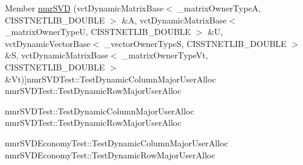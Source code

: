 \begin{DoxyRefList}
Member \hyperlink{nmr_s_v_d_8h_a671bda5b8998b6c851b3a497f2903560}{nmr\-S\-V\-D} (vct\-Dynamic\-Matrix\-Base$<$ \-\_\-matrix\-Owner\-Type\-A, C\-I\-S\-S\-T\-N\-E\-T\-L\-I\-B\-\_\-\-D\-O\-U\-B\-L\-E $>$ \&A, vct\-Dynamic\-Matrix\-Base$<$ \-\_\-matrix\-Owner\-Type\-U, C\-I\-S\-S\-T\-N\-E\-T\-L\-I\-B\-\_\-\-D\-O\-U\-B\-L\-E $>$ \&U, vct\-Dynamic\-Vector\-Base$<$ \-\_\-vector\-Owner\-Type\-S, C\-I\-S\-S\-T\-N\-E\-T\-L\-I\-B\-\_\-\-D\-O\-U\-B\-L\-E $>$ \&S, vct\-Dynamic\-Matrix\-Base$<$ \-\_\-matrix\-Owner\-Type\-Vt, C\-I\-S\-S\-T\-N\-E\-T\-L\-I\-B\-\_\-\-D\-O\-U\-B\-L\-E $>$ \&Vt)]nmr\-S\-V\-D\-Test\-::\-Test\-Dynamic\-Column\-Major\-User\-Alloc nmr\-S\-V\-D\-Test\-::\-Test\-Dynamic\-Row\-Major\-User\-Alloc 
\item[\label{test__test000019}%
\hypertarget{test__test000019}{}%
Member \hyperlink{nmr_s_v_d_8h_a43e3f84f416adc9ceb70daf99fd14b2b}{nmr\-S\-V\-D} (vct\-Dynamic\-Matrix\-Base$<$ \-\_\-matrix\-Owner\-Type\-A, C\-I\-S\-S\-T\-N\-E\-T\-L\-I\-B\-\_\-\-D\-O\-U\-B\-L\-E $>$ \&A, vct\-Dynamic\-Matrix\-Base$<$ \-\_\-matrix\-Owner\-Type\-U, C\-I\-S\-S\-T\-N\-E\-T\-L\-I\-B\-\_\-\-D\-O\-U\-B\-L\-E $>$ \&U, vct\-Dynamic\-Vector\-Base$<$ \-\_\-vector\-Owner\-Type\-S, C\-I\-S\-S\-T\-N\-E\-T\-L\-I\-B\-\_\-\-D\-O\-U\-B\-L\-E $>$ \&S, vct\-Dynamic\-Matrix\-Base$<$ \-\_\-matrix\-Owner\-Type\-Vt, C\-I\-S\-S\-T\-N\-E\-T\-L\-I\-B\-\_\-\-D\-O\-U\-B\-L\-E $>$ \&Vt, vct\-Dynamic\-Vector\-Base$<$ \-\_\-vector\-Owner\-Type\-Workspace, C\-I\-S\-S\-T\-N\-E\-T\-L\-I\-B\-\_\-\-D\-O\-U\-B\-L\-E $>$ \&Workspace)]nmr\-S\-V\-D\-Test\-::\-Test\-Dynamic\-Column\-Major\-User\-Alloc nmr\-S\-V\-D\-Test\-::\-Test\-Dynamic\-Row\-Major\-User\-Alloc  
\item[\label{test__test000025}%
\hypertarget{test__test000025}{}%
Member \hyperlink{nmr_s_v_d_economy_8h_a838d5cc272226fda8e2aed9830f405e3}{nmr\-S\-V\-D\-Economy} (vct\-Dynamic\-Matrix\-Base$<$ \-\_\-matrix\-Owner\-Type\-A, C\-I\-S\-S\-T\-N\-E\-T\-L\-I\-B\-\_\-\-D\-O\-U\-B\-L\-E $>$ \&A, vct\-Dynamic\-Matrix\-Base$<$ \-\_\-matrix\-Owner\-Type\-U, C\-I\-S\-S\-T\-N\-E\-T\-L\-I\-B\-\_\-\-D\-O\-U\-B\-L\-E $>$ \&U, vct\-Dynamic\-Vector\-Base$<$ \-\_\-vector\-Owner\-Type\-S, C\-I\-S\-S\-T\-N\-E\-T\-L\-I\-B\-\_\-\-D\-O\-U\-B\-L\-E $>$ \&S, vct\-Dynamic\-Matrix\-Base$<$ \-\_\-matrix\-Owner\-Type\-Vt, C\-I\-S\-S\-T\-N\-E\-T\-L\-I\-B\-\_\-\-D\-O\-U\-B\-L\-E $>$ \&Vt, vct\-Dynamic\-Vector\-Base$<$ \-\_\-vector\-Owner\-Type\-Workspace, C\-I\-S\-S\-T\-N\-E\-T\-L\-I\-B\-\_\-\-D\-O\-U\-B\-L\-E $>$ \&Workspace)]nmr\-S\-V\-D\-Economy\-Test\-::\-Test\-Dynamic\-Column\-Major\-User\-Alloc nmr\-S\-V\-D\-Economy\-Test\-::\-Test\-Dynamic\-Row\-Major\-User\-Alloc  

\end{DoxyRefList}

